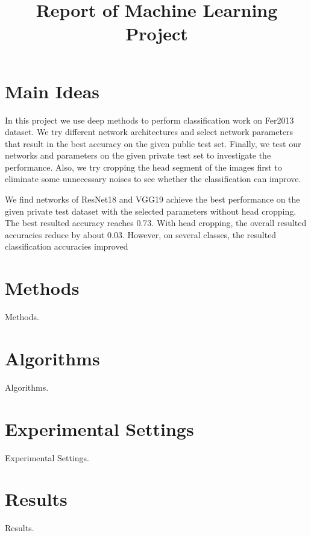 \documentclass[conference]{IEEEtran}
\begin{document}
\title{Report of Machine Learning Project\\
}

\author{

\and




}

\maketitle

\section{Main Ideas}
In this project we use deep methods to perform classification work on Fer2013 dataset. We try different network architectures and select network parameters that result in the best accuracy on the given public test set. Finally, we test our networks and parameters on the given private test set to investigate the performance. Also, we try cropping the head segment of the images first to eliminate some unnecessary noises to see whether the classification can improve.

We find networks of ResNet18 and VGG19 achieve the best performance on the given private test dataset with the selected parameters without head cropping. The best resulted accuracy reaches 0.73. With head cropping, the overall resulted accuracies reduce by about 0.03. However, on several classes, the resulted classification accuracies improved
\section{Methods}
Methods.

\section{Algorithms}
Algorithms.

\section{Experimental Settings}
Experimental Settings.

\section{Results}
Results.
\end{document}
